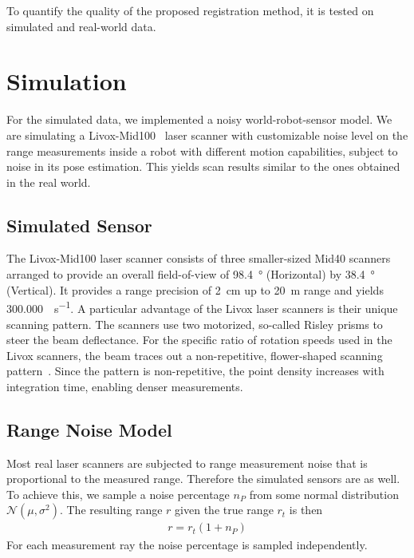 To quantify the quality of the proposed registration method, it is tested on simulated and real-world data. 

\section{Simulation}

For the simulated data, we implemented a noisy world-robot-sensor model.  
We are simulating a Livox-Mid100~\cite{LivoxMid40-100} laser scanner with customizable noise level on the range measurements inside a robot with different motion capabilities, subject to noise in its pose estimation. 
This yields scan results similar to the ones obtained in the real world.

\subsection{Simulated Sensor}

The Livox-Mid100 laser scanner consists of three smaller-sized Mid40 scanners arranged to provide an overall field-of-view of \SI{98.4}{\degree} (Horizontal) by \SI{38.4}{\degree} (Vertical).
It provides a range precision of \SI{2}{\centi\meter} up to \SI{20}{\meter} range and yields \SI[per-mode=symbol]{300,000}{\pts\per\second}.
A particular advantage of the Livox laser scanners is their unique scanning pattern.
The scanners use two motorized, so-called Risley prisms to steer the beam deflectance.
For the specific ratio of rotation speeds used in the Livox scanners, the beam traces out a non-repetitive, flower-shaped scanning pattern~\cite{thorlabs}.
Since the pattern is non-repetitive, the point density increases with integration time, enabling denser measurements.

\subsection{Range Noise Model}

Most real laser scanners are subjected to range measurement noise that is proportional to the measured range. 
Therefore the simulated sensors are as well. 
To achieve this, we sample a noise percentage $n_P$ from some normal distribution $\mathcal{N}(\mu,\sigma^2)$. 
The resulting range $r$ given the true range $r_t$ is then
\begin{align}
	r = r_t(1+n_P)
\end{align}
For each measurement ray the noise percentage is sampled independently. 

